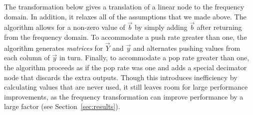 The transformation below gives a {\naive} translation of a linear node
to the frequency domain.  In addition, it relaxes all of the
assumptions that we made above.  The algorithm allows for a non-zero
value of ${\vec b}$ by simply adding $\vec{b}$ after returning from
the frequency domain.  To accommodate a push rate greater than one,
the algorithm generates {\it matrices} for $\vec{Y}$ and $\vec{y}$ and
alternates pushing values from each column of $\vec{y}$ in turn.
Finally, to accommodate a pop rate greater than one, the algorithm
proceeds as if the pop rate was one and adds a special decimator node
that discards the extra outputs.  Though this introduces inefficiency
by calculating values that are never used, it still leaves room for
large performance improvements, as the frequency transformation can
improve performance by a large factor (see Section~\ref{sec:results}).


